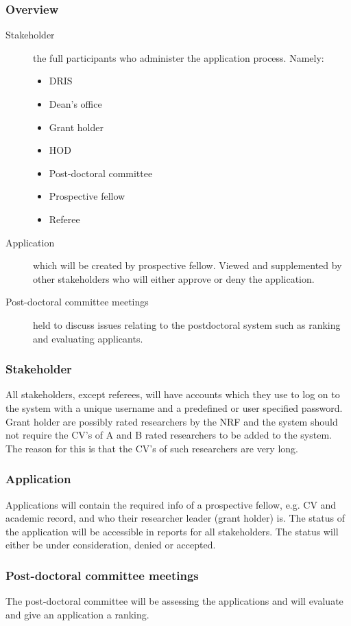 \documentclass[12pt]{article}
\begin{document}
		\subsubsection{Overview}
		\begin{description}
			\item[Stakeholder] the full participants who administer the application process. Namely: 
				\begin{itemize}
					\item DRIS
					\item Dean's office
					\item Grant holder
					\item HOD
					\item Post-doctoral committee
					\item Prospective fellow
					\item Referee
				\end{itemize}
			\item[Application] which will be created by prospective fellow. Viewed and supplemented by other stakeholders who will either approve or deny the application.
			\item[Post-doctoral committee meetings] held to discuss issues relating to the postdoctoral system such as ranking and evaluating applicants.
		\end{description}
		\vspace{0.5in}
		\subsubsection{Stakeholder}
		All stakeholders, except referees, will have accounts which they use to log on to the system with a unique username and a predefined or user specified password.\linebreak 
		Grant holder are possibly rated researchers by the NRF and the system should not require the CV's of A and B rated researchers to be added to the system. The reason for this is that the CV's of such researchers are very long.
		\subsubsection{Application}
		Applications will contain the required info of a prospective fellow, e.g. CV and academic record, and who their researcher leader (grant holder) is. The status of the application will be accessible in reports for all stakeholders. The status will either be under consideration, denied or accepted.
		\subsubsection{Post-doctoral committee meetings}
		The post-doctoral committee will be assessing the applications and will evaluate and give an application a ranking.
		
\end{document}
